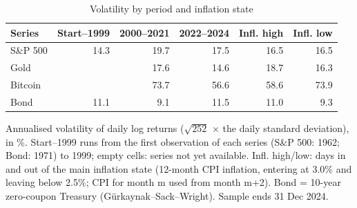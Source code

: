 \begin{table}[t]
\centering
\scriptsize
\caption{Volatility by period and inflation state}
\label{tab:tab_volatility}
\begin{tabular}{lrrrrr}
\toprule
Series & Start–1999 & 2000–2021 & 2022–2024 & Infl. high & Infl. low \\
\midrule
S\&P 500 & 14.3 & 19.7 & 17.5 & 16.5 & 16.5 \\
Gold &  & 17.6 & 14.6 & 18.7 & 16.3 \\
Bitcoin &  & 73.7 & 56.6 & 58.6 & 73.9 \\
Bond & 11.1 & 9.1 & 11.5 & 11.0 & 9.3 \\
\bottomrule
\end{tabular}
\par\smallskip
\parbox{\linewidth}{\footnotesize Annualised volatility of daily log returns ($\sqrt{252}$ $\times$ the daily standard deviation), in \%. Start--1999 runs from the first observation of each series (S\&P 500: 1962; Bond: 1971) to 1999; empty cells: series not yet available. Infl. high/low: days in and out of the main inflation state (12-month CPI inflation, entering at 3.0\% and leaving below 2.5\%; CPI for month m used from month m+2). Bond = 10-year zero-coupon Treasury (G\"urkaynak--Sack--Wright). Sample ends 31 Dec 2024.}
\end{table}
